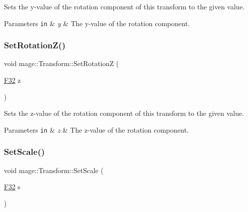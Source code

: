 Sets the y-\/value of the rotation component of this transform to the given value.


\begin{DoxyParams}[1]{Parameters}
\mbox{\tt in}  & {\em y} & The y-\/value of the rotation component. \\
\hline
\end{DoxyParams}
\hypertarget{classmage_1_1_transform_aca5e1d7c83e91f9c36be98c4a4a2163b}{}\label{classmage_1_1_transform_aca5e1d7c83e91f9c36be98c4a4a2163b} 
\subsubsection{\texorpdfstring{Set\+Rotation\+Z()}{SetRotationZ()}}
{\footnotesize\ttfamily void mage\+::\+Transform\+::\+Set\+RotationZ (\begin{DoxyParamCaption}\item[{\hyperlink{namespacemage_aa97e833b45f06d60a0a9c4fc22ae02c0}{F32}}]{z }\end{DoxyParamCaption})\hspace{0.3cm}{\ttfamily [noexcept]}}

Sets the z-\/value of the rotation component of this transform to the given value.


\begin{DoxyParams}[1]{Parameters}
\mbox{\tt in}  & {\em z} & The z-\/value of the rotation component. \\
\hline
\end{DoxyParams}
\hypertarget{classmage_1_1_transform_acf366489ae37e771e3f7b06c6452cb33}{}\label{classmage_1_1_transform_acf366489ae37e771e3f7b06c6452cb33} 
\subsubsection{\texorpdfstring{Set\+Scale()}{SetScale()}\hspace{0.1cm}{\footnotesize\ttfamily [1/5]}}
{\footnotesize\ttfamily void mage\+::\+Transform\+::\+Set\+Scale (\begin{DoxyParamCaption}\item[{\hyperlink{namespacemage_aa97e833b45f06d60a0a9c4fc22ae02c0}{F32}}]{s }\end{DoxyParamCaption})\hspace{0.3cm}{\ttfamily [noexcept]}}

